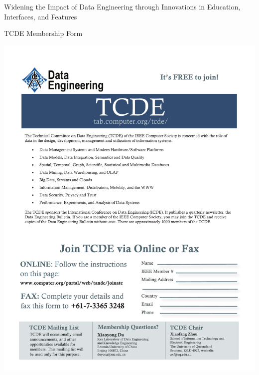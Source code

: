 \documentclass[11pt]{article}
\begin{document}
\begin{bulletin}
\begin{articlesection}{Widening the Impact of Data Engineering through Innovations in Education, Interfaces, and Features}
\end{articlesection}

% 
% 


\begin{callsection}

%
%
\begin{call}{TCDE Membership Form}
\centerline{\includegraphics[width=\textwidth, bb= 0 0 590 760] {tcde.pdf}}
\end{call}

\end{callsection}

\end{bulletin}
\end{document}
